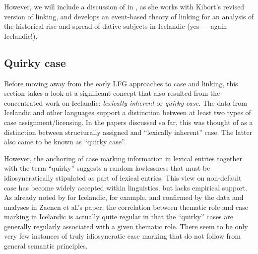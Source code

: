\documentclass[output=paper,hidelinks]{langscibook}
\begin{document}
    However, we will include a discussion of \citet{schaetzle18} in 
    , as she works with Kibort's revised version of linking, and
    develops an event-based theory of linking for an analysis of the
    historical rise and spread of dative subjects in Icelandic (yes --- again
    Icelandic!). 


\subsection{Quirky case}


Before moving away from the early LFG approaches to case and linking, this
section takes a look at a significant concept that also resulted from
the concentrated work on Icelandic:  {\em lexically inherent} or {\em quirky
  case}.  The data from Icelandic and other languages support a distinction between at
least two types of case assignment/licensing.  In the papers discussed so far,
this was thought of as a distinction between 
structurally assigned  and  ``lexically inherent'' case.  The latter also came
to be known as ``quirky case''. 


However, the anchoring of case marking information in lexical entries together
with the term ``quirky'' suggests a random lawlessness that must be
idiosyncratically stipulated as part of lexical entries.
This view on non-default case has become widely accepted within
 linguistics, but lacks empirical support. 
As already noted by \citet{Andrews82} for Icelandic, for example,  and confirmed
by the data and analyses in 
Zaenen et al.'s paper, the correlation between thematic role and case marking in
Icelandic is
actually quite regular in that the ``quirky''  cases are
generally regularly associated with a given thematic role.  There seem to be only very few
instances of truly idiosyncratic case marking that do not follow from general
semantic principles.
\end{document}
